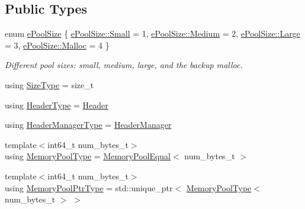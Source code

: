 \subsection*{Public Types}
\begin{DoxyCompactItemize}
\item 
enum \hyperlink{structvt_1_1pool_1_1_pool_ace8d36439e5e599a8ee68b2f1a6a6b28}{e\+Pool\+Size} \{ \hyperlink{structvt_1_1pool_1_1_pool_ace8d36439e5e599a8ee68b2f1a6a6b28a2660064e68655415da2628c2ae2f7592}{e\+Pool\+Size\+::\+Small} = 1, 
\hyperlink{structvt_1_1pool_1_1_pool_ace8d36439e5e599a8ee68b2f1a6a6b28a87f8a6ab85c9ced3702b4ea641ad4bb5}{e\+Pool\+Size\+::\+Medium} = 2, 
\hyperlink{structvt_1_1pool_1_1_pool_ace8d36439e5e599a8ee68b2f1a6a6b28a3a69b34ce86dacb205936a8094f6c743}{e\+Pool\+Size\+::\+Large} = 3, 
\hyperlink{structvt_1_1pool_1_1_pool_ace8d36439e5e599a8ee68b2f1a6a6b28a1131a914388fac73e5f07b0ba0aad523}{e\+Pool\+Size\+::\+Malloc} = 4
 \}\begin{DoxyCompactList}\small\item\em Different pool sizes\+: small, medium, large, and the backup malloc. \end{DoxyCompactList}
\item 
using \hyperlink{structvt_1_1pool_1_1_pool_a4030898e09d0160c24743a7b949c0d46}{Size\+Type} = size\+\_\+t
\item 
using \hyperlink{structvt_1_1pool_1_1_pool_a887de970f8d8fbec63df120348c31404}{Header\+Type} = \hyperlink{structvt_1_1pool_1_1_header}{Header}
\item 
using \hyperlink{structvt_1_1pool_1_1_pool_acc5ad2d64bf6ff58fead958a69c12d74}{Header\+Manager\+Type} = \hyperlink{structvt_1_1pool_1_1_header_manager}{Header\+Manager}
\item 
{\footnotesize template$<$int64\+\_\+t num\+\_\+bytes\+\_\+t$>$ }\\using \hyperlink{structvt_1_1pool_1_1_pool_a06673914350d933ad5205155eca14a3b}{Memory\+Pool\+Type} = \hyperlink{structvt_1_1pool_1_1_memory_pool_equal}{Memory\+Pool\+Equal}$<$ num\+\_\+bytes\+\_\+t $>$
\item 
{\footnotesize template$<$int64\+\_\+t num\+\_\+bytes\+\_\+t$>$ }\\using \hyperlink{structvt_1_1pool_1_1_pool_a21e20f5b56c3bae4f0d0cc36ed9c5eee}{Memory\+Pool\+Ptr\+Type} = std\+::unique\+\_\+ptr$<$ \hyperlink{structvt_1_1pool_1_1_pool_a06673914350d933ad5205155eca14a3b}{Memory\+Pool\+Type}$<$ num\+\_\+bytes\+\_\+t $>$ $>$
\end{DoxyCompactItemize}
